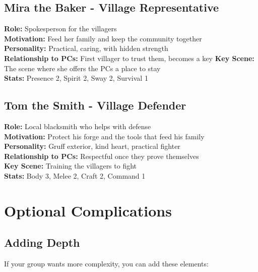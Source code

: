 \documentclass[11pt]{article}
\newenvironment{characterbox}[1]{%
  \begin{mdframed}[backgroundcolor=shadecolor, linewidth=1pt, linecolor=headercolor]%
  \subsection*{#1}%
}{%
  \end{mdframed}%
}
\begin{document}
\begin{characterbox}{Mira the Baker - Village Representative}
\textbf{Role:} Spokesperson for the villagers \\
\textbf{Motivation:} Feed her family and keep the community together \\
\textbf{Personality:} Practical, caring, with hidden strength \\
\textbf{Relationship to PCs:} First villager to trust them, becomes a key
\textbf{Key Scene:} The scene where she offers the PCs a place to stay \\
\textbf{Stats:} Presence 2, Spirit 2, Sway 2, Survival 1
\end{characterbox}

\begin{characterbox}{Tom the Smith - Village Defender}
\textbf{Role:} Local blacksmith who helps with defense \\
\textbf{Motivation:} Protect his forge and the tools that feed his family \\
\textbf{Personality:} Gruff exterior, kind heart, practical fighter \\
\textbf{Relationship to PCs:} Respectful once they prove themselves \\
\textbf{Key Scene:} Training the villagers to fight \\
\textbf{Stats:} Body 3, Melee 2, Craft 2, Command 1
\end{characterbox}

\section{Optional Complications}

\subsection{Adding Depth}

If your group wants more complexity, you can add these elements:
\end{document}
